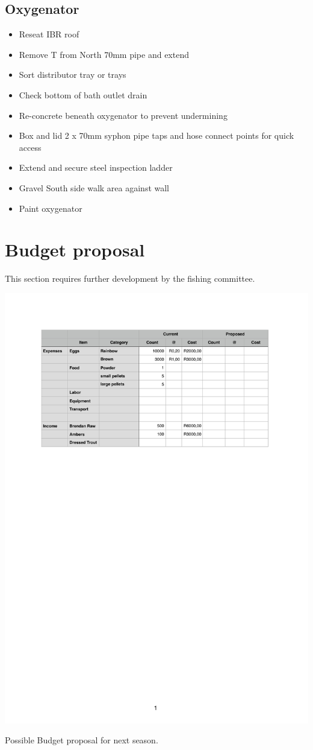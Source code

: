\subsection{Oxygenator}
\begin{itemize}
\item Reseat IBR roof \checkmark
\item Remove T from North 70mm pipe and extend  \checkmark
\item Sort distributor tray or trays \checkmark
\item Check bottom of bath outlet drain \checkmark
\item Re-concrete beneath oxygenator to prevent undermining \checkmark
\item Box and lid 2 x 70mm syphon pipe taps and hose connect points for quick access 
\item Extend and secure steel inspection ladder
\item Gravel South side walk area against wall 
\item Paint oxygenator
\end{itemize}


\section{Budget proposal}

This section requires further development by the fishing committee.

\begin{table}[H]
  \centering
  \includegraphics[scale = 0.9]{tables/TablesBudget.pdf}
   \caption{Possible Budget proposal for next season.}
  \label{tab:Budget}
\end{table}
 


